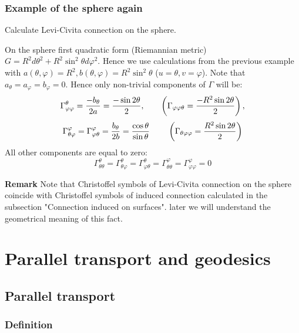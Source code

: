 \documentclass[12pt]{article}
\theoremstyle{theorem}
\numberwithin{equation}{section}
\begin{document}
\subsubsection {Example of the sphere again}

 {Calculate Levi-Civita connection on the sphere.

 On the sphere first quadratic form (Riemannian metric)
 $G=R^2d\theta^2+R^2\sin^2\theta d\varphi^2$.  Hence we
 use calculations from the previous example
 with $a(\theta,\varphi)=R^2, b(\theta,\varphi)=R^2\sin^2 \theta$
  ($u=\theta, v=\varphi$).
 Note that $a_\theta=a_\varphi=b_\varphi=0$.
  Hence only non-trivial components
 of $\Gamma$ will be:
\begin{equation}\label{Christoffelforsphere:}
  \Gamma^{\theta}_{\varphi\varphi}={-b_\theta\over 2a}={-\sin 2\theta\over 2},
  \qquad
  \left(\Gamma_{\varphi\varphi\theta}={-R^2\sin 2\theta\over 2}\right),
       \end{equation}
  \begin{equation}\label{connectionforsphere}
  \Gamma^{\varphi}_{\theta\varphi}=\Gamma^{\varphi}_{\varphi\theta}=
  {b_\theta\over 2b}={\cos\theta \over \sin\theta}\,
  \qquad
  \left(\Gamma_{\theta\varphi\varphi}={R^2\sin 2\theta\over 2}\right)
\end{equation}
All other components are equal to zero:
                 $$
  \Gamma^{\theta}_{\theta\theta}=\Gamma^{\theta}_{\theta\varphi}=\Gamma^{\theta}_{\varphi\theta}=
  \Gamma^{\varphi}_{\theta\theta}=\Gamma^{\varphi}_{\varphi\varphi}=0
             $$

{\bf Remark} Note that Christoffel symbols of Levi-Civita connection on the sphere coincide
with  Christoffel symbols of induced connection calculated
in the subsection "Connection induced on surfaces".
later we will understand the geometrical meaning of this fact.






   \section {Parallel transport and geodesics}

   \subsection{Parallel transport}

\subsubsection {Definition}

}
\end{document}
